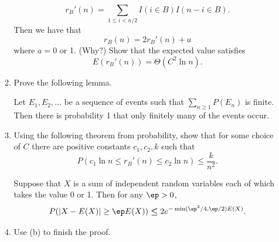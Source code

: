 \begin{enumerate}
\begin{enumerate}
\[r_B'(n)=\sum_{1\leq i<n/2} I(i\in B)I(n-i\in B).\]
Then we have that
\[r_B(n)=2r_B'(n) + a\]
where $a=0$ or 1. (Why?) Show that the expected value satisfies
\[E(r_B'(n))=\Theta(C^2\ln n).\]
\item Prove the following lemma.
\begin{lem}
Let $E_1,E_2,\ldots$ be a sequence of events such that $\sum_{n\geq 1} P(E_n)$ is finite. Then there is probability 1 that only finitely many of the events occur.
\end{lem}
\item Using the following theorem from probability, 
show that for some choice of $C$ there are positive constants $c_1,c_2,k$ such that
\[
P(c_1\ln n \leq r_B'(n)\leq c_2\ln n)\leq \frac{k}{n^2}.
\]
\begin{thm}
Suppose that $X$ is a sum of independent random variables each of which takes the value 0 or 1. Then for any $\ep>0$,
\[P(|X-E(X)|\geq \ep E(X))\boldsymbol \leq 2e^{-\min(\ep^2/4,\ep/2)E(X)}.\]
\end{thm}
\item Use (b) to finish the proof.
\end{enumerate}
\end{enumerate}
